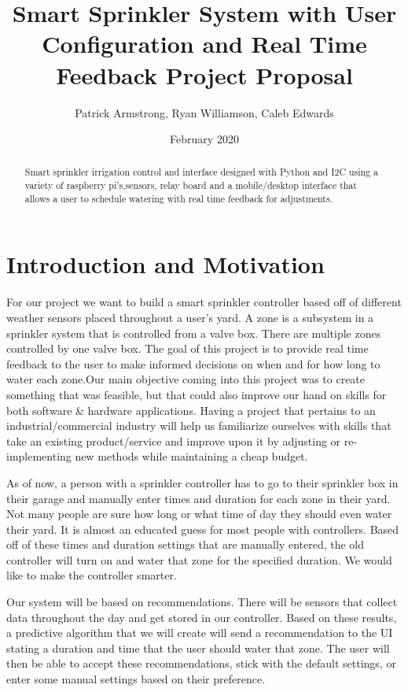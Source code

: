 \documentclass[letterpaper, 10 pt, conference]{ieeeconf}  %
\title{Smart Sprinkler System with User Configuration and Real Time Feedback Project Proposal}
\author{Patrick Armstrong, Ryan Williamson, Caleb Edwards}
\date{February 2020}
\begin{document}
\maketitle

\begin{abstract}
Smart sprinkler irrigation control and interface designed with Python and I2C using a variety of raspberry pi's,sensors, relay board and a mobile/desktop interface that allows a user to schedule watering with real time feedback for adjustments.
\end{abstract}

\section{Introduction and Motivation}
For our project we want to build a smart sprinkler controller based off of different weather sensors placed throughout a user's yard. A zone is a subsystem in a sprinkler system that is controlled from a valve box. There are multiple zones controlled by one valve box. The goal of this project is to provide real time feedback to the user to make informed decisions on when and for how long to water each zone.Our main objective coming into this project was to create something that was feasible, but that could also improve our hand on skills for both software \& hardware applications. Having a project that pertains to an industrial/commercial industry will help us familiarize ourselves with skills that take an existing product/service and improve upon it by adjusting or re-implementing new methods while maintaining a cheap budget.

As of now, a person with a sprinkler controller has to go to their sprinkler box in their garage and manually enter times and duration for each zone in their yard. Not many people are sure how long or what time of day they should even water their yard. It is almost an educated guess for most people with controllers. Based off of these times and duration settings that are manually entered, the old controller will turn on and water that zone for the specified duration. We would like to make the controller smarter. 

Our system will be based on recommendations. There will be sensors that collect data throughout the day and get stored in our controller. Based on these results, a predictive algorithm that we will create will send a recommendation to the UI stating a duration and time that the user should water that zone. The user will then be able to accept these recommendations, stick with the default settings, or enter some manual settings based on their preference. 
\end{document}
